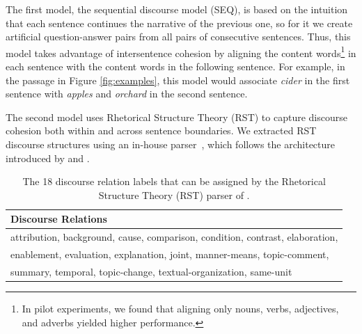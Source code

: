 The first model, the sequential discourse model (SEQ), is based on the intuition that each sentence continues the narrative of the previous one, so for it we create artificial question-answer pairs from all pairs of consecutive sentences.
Thus, this model takes advantage of intersentence cohesion by aligning the content words\footnote{In pilot experiments, we found that aligning only nouns, verbs, adjectives, and adverbs yielded higher performance.} in each sentence with the content words in the following sentence.  For example, in the passage in Figure \ref{fig:examples}, this model would associate \emph{cider} in the first sentence with \emph{apples} and \emph{orchard} in the second sentence.

The second model uses Rhetorical Structure Theory (RST) to capture discourse cohesion both within and across sentence boundaries.  
We extracted RST discourse structures using an in-house parser~\citep{Surdeanu:15}, which follows the architecture introduced by \citet{hernault10} and \citet{feng12}.

\begin{table}[t!]
\begin{center}
\begin{tabular}{l}
\toprule
\textbf{Discourse Relations}  \\
\midrule
attribution, background, cause, comparison, condition, contrast, elaboration,\\ enablement, evaluation, explanation, joint, manner-means, topic-comment,\\ summary, temporal, topic-change, textual-organization, same-unit\\
\end{tabular}
\caption{ \label{tab:rst} 
The 18 discourse relation labels that can be assigned by the Rhetorical Structure Theory (RST) parser of \citet{Surdeanu:15}.
}

\label{tab:examples}
\end{center}
\end{table}

